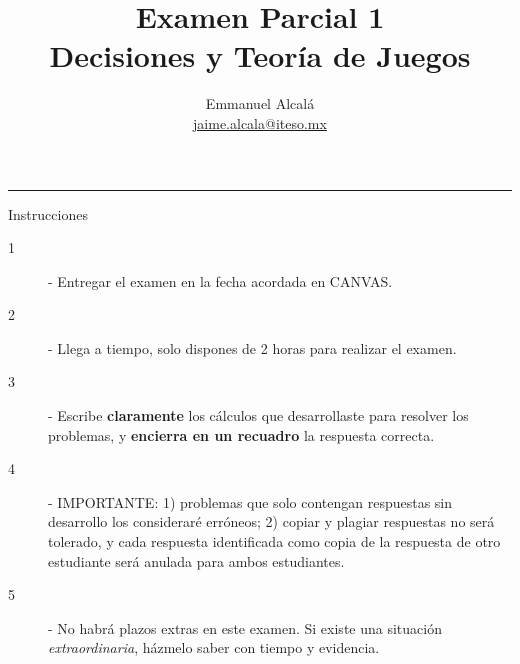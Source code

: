\documentclass[12pt]{scrartcl}
\title{Examen Parcial 1 \\ \normalsize Decisiones y Teoría de Juegos}
\author{Emmanuel Alcalá\\ \url{jaime.alcala@iteso.mx}}
\date{}
\begin{document}

\maketitle

\hrule

\begin{summarybox}{Instrucciones}

    \begin{description}
        \item[1] - Entregar el examen en la fecha acordada en CANVAS.
        \item[2] - Llega a tiempo, solo dispones de 2 horas para realizar el examen.
        \item[3] - Escribe \textbf{claramente} los cálculos que desarrollaste para resolver los problemas, y \textbf{encierra en un recuadro} la respuesta correcta.
        \item[4] - {\color{blue} IMPORTANTE}: 1) problemas que solo contengan respuestas sin desarrollo los consideraré {\color{red} erróneos}; 2) copiar y plagiar respuestas no será tolerado, y cada respuesta identificada como copia de la respuesta de otro estudiante será {\color{red} anulada} para ambos estudiantes.
        \item[5] - No habrá plazos extras en este examen. Si existe una situación \textit{extraordinaria}, házmelo saber con tiempo y evidencia.
    \end{description}

\end{summarybox}
\end{document}
